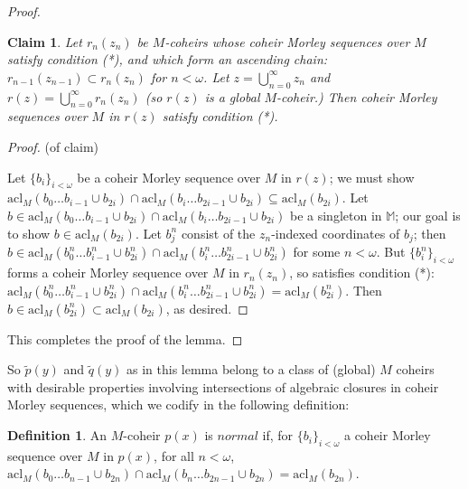 \documentclass{amsart}
\newtheorem{claim}[theorem]{Claim}
\theoremstyle{definition}
\newtheorem{definition}[theorem]{Definition}
\theoremstyle{remark}
\numberwithin{equation}{section}
\begin{document}
\begin{proof}
\begin{claim}
    Let $r_{n}(z_{n})$ be $M$-coheirs whose coheir Morley sequences over $M$ satisfy condition (*), and which form an ascending chain:  $r_{n-1}(z_{n-1}) \subset r_{n}(z_{n})$ for $n < \omega$. Let $z = \bigcup^{\infty}_{n=0} z_{n}$ and $r(z)= \bigcup^{\infty}_{n=0} r_{n}(z_{n})$ (so $r(z)$ is a global $M$-coheir.) Then coheir Morley sequences over $M$ in $r(z)$ satisfy condition (*).
\end{claim}




\begin{proof}
    (of claim) 
    
    Let $\{b_{i}\}_{i < \omega}$ be a coheir Morley sequence over $M$ in $r(z)$; we must show  $\mathrm{acl}_{M}(b_{0} \ldots b_{i-1} \cup b_{2i}) \cap \mathrm{acl}_{M}(b_{i} \ldots b_{2i-1} \cup b_{2i})\subseteq \mathrm{acl}_{M}(b_{2i})$. Let $b \in \mathrm{acl}_{M}(b_{0} \ldots b_{i-1} \cup b_{2i}) \cap \mathrm{acl}_{M}(b_{i} \ldots b_{2i-1} \cup b_{2i})$ be a singleton in $\mathbb{M}$; our goal is to show $b \in \mathrm{acl}_{M}(b_{2i})$. Let $b^{n}_{j}$ consist of the $z_{n}$-indexed coordinates of $b_{j}$;  then  $b \in \mathrm{acl}_{M}(b^{n}_{0} \ldots b^{n}_{i-1} \cup b^{n}_{2i}) \cap \mathrm{acl}_{M}(b^{n}_{i} \ldots b^{n}_{2i-1} \cup b^{n}_{2i})$ for some $n < \omega$. But $\{b_{i}^{n}\}_{i < \omega}$ forms a coheir Morley sequence over $M$ in $r_{n}(z_{n})$, so satisfies condition (*): $\mathrm{acl}_{M}(b^{n}_{0} \ldots b^{n}_{i-1} \cup b^{n}_{2i}) \cap \mathrm{acl}_{M}(b^{n}_{i} \ldots b^{n}_{2i-1} \cup b^{n}_{2i}) = \mathrm{acl}_{M}(b^{n}_{2i})$. Then  $b \in \mathrm{acl}_{M}(b^{n}_{2i}) \subset \mathrm{acl}_{M}(b_{2i})$, as desired.
\end{proof}
This completes the proof of the lemma.
    
\end{proof}


So $\tilde{p}(y)$ and $\tilde{q}(y)$ as in this lemma belong to a class of (global) $M$ coheirs with desirable properties involving intersections of algebraic closures in coheir Morley sequences, which we codify in the following definition:


\begin{definition}
\label{normal coheir}    An $M$-coheir $p(x)$ is $\textit{normal}$ if, for $\{b_{i}\}_{i< \omega}$ a coheir Morley sequence over $M$ in $p(x)$, for all $n < \omega$, $\mathrm{acl}_{M}(b_{0} \ldots b_{n-1} \cup b_{2n}) \cap \mathrm{acl}_{M}(b_{n} \ldots b_{2n-1} \cup b_{2n})=\mathrm{acl}_{M}(b_{2n})$.
\end{definition}
\end{document}
